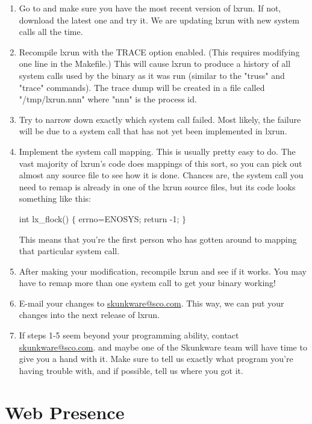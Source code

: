 \documentclass[letterpaper]{article}
\begin{document}
\begin{enumerate}
\item  Go to  and make
sure you have the most recent version of lxrun.  If not,
download the latest one and try it.  We are updating
lxrun with new system calls all the time.
\item  Recompile lxrun with the TRACE option enabled.  (This
requires modifying one line in the Makefile.)  This will
cause lxrun to produce a history of all system calls
used by the binary as it was run (similar to the
"truss" and "trace" commands).  The trace dump will be
created in a file called "/tmp/lxrun.nnn" where "nnn" is
the process id.
\item  Try to narrow down exactly which system call failed.
Most likely, the failure will be due to a system call
that has not yet been implemented in lxrun.
\item  Implement the system call mapping.  This is usually
pretty easy to do.  The vast majority of lxrun's code
does mappings of this sort, so you can pick out almost
any source file to see how it is done.  Chances are, the
system call you need to remap is already in one of the
lxrun source files, but its code looks something like
this:

int lx\_flock()          $\{$ errno=ENOSYS; return -1; $\}$    

This means that you're the first person who has gotten
around to mapping that particular system call.
\item  After making your modification, recompile lxrun and
see if it works.  You may have to remap more than one
system call to get your binary working!
\item  E-mail your changes to 
\url{skunkware@sco.com}.
This way, we can put your changes into the next release of lxrun.
\item  If steps 1-5 seem beyond your programming
ability, contact 
\url{skunkware@sco.com}.
and maybe one of the
Skunkware team will have time to give you a hand with it.
Make sure to tell us exactly what program you're having
trouble with, and if possible, tell us where you got it.
\end{enumerate}





\section{Web Presence}
\end{document}
